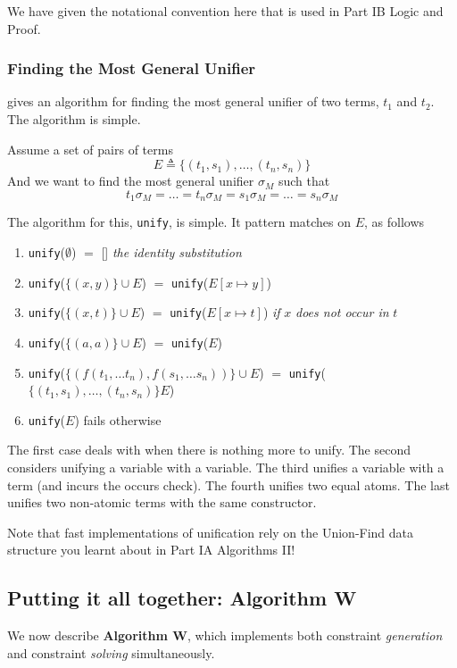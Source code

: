 {We have given the notational convention here that is used in \textsf{Part IB Logic and Proof}.

\subsubsection{Finding the Most General Unifier}
\citet{robinson-1965} gives an algorithm for finding the most general unifier of two terms, $t_1$ and $t_2$. The algorithm is simple.

Assume a set of pairs of terms 
\[E \triangleq \{(t_1, s_1), \ldots, (t_n, s_n)\}\]
And we want to find the most general unifier $\sigma_M$ such that
\[t_1\sigma_M = \ldots = t_n\sigma_M = s_1\sigma_M = \ldots = s_n\sigma_M\]

The algorithm for this, \texttt{unify}, is simple. It pattern matches on $E$, as follows

\begin{enumerate}
    \item \texttt{unify}($\emptyset$) $=$ [] \textit{the identity substitution}
    \item \texttt{unify}($\{(x, y)\} \cup E$) $=$ \texttt{unify}($E[x \mapsto y]$)
    \item \texttt{unify}($\{(x, t)\} \cup E$) $=$ \texttt{unify}($E[x \mapsto t]$) \textit{if} $x$ \textit{does not occur in} $t$
    \item \texttt{unify}($\{(a, a)\} \cup E$) $=$ \texttt{unify}($E$)
    \item \texttt{unify}($\{(f(t_1, \ldots t_n), f(s_1, \ldots s_n))\} \cup E$) $=$ \texttt{unify}($\{(t_1, s_1), \ldots, (t_n, s_n)\} E$)
    \item \texttt{unify}($E$) fails otherwise
\end{enumerate}

The first case deals with when there is nothing more to unify. The second considers unifying a variable with a variable. The third unifies a variable with a term (and incurs the occurs check). The fourth unifies two equal atoms. The last unifies two non-atomic terms with the same constructor.

Note that fast implementations of unification rely on the Union-Find data structure you learnt about in \textsf{Part IA Algorithms II}!

\subsection{Putting it all together: Algorithm W}
We now describe \textbf{Algorithm W}, which implements both constraint \textit{generation} and constraint \textit{solving} simultaneously.

}
